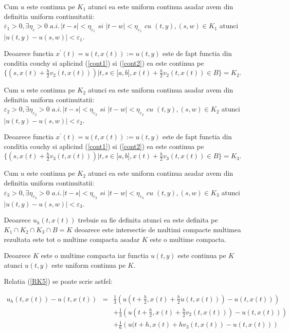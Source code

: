 \documentclass[a4paper,twoside]{book}
\begin{document}
Cum $u$ este continua pe $K_{1}$ atunci ea este uniform continua asadar avem
din definitia uniform continuitatii: \thinspace $\varepsilon _{1}>0,\exists
\eta _{\varepsilon }>0\,\,a.i.\,|t-s|<\eta _{\varepsilon
_{1}}\,\,si\,\,|t-w|<\eta _{\varepsilon _{1}}\,\,cu\,\,(t,y),(s,w)\in K_{1}$
atunci $\left\vert u(t,y)-u(s,w)\right\vert <\varepsilon _{1}$.

Deoarece functia $x^{\prime }(t)=u(t,x(t)):=u(t,y)$ este de fapt functia din
conditia couchy si aplicind (\ref{cont1}) si (\ref{cont2}) ea este continua
pe $\{(s,x(t)+\frac{h}{2}v_{2}(t,x(t)))|t,s\in \lbrack a,b],x(t)+\frac{h}{2}%
v_{2}(t,x(t))\in B\}=K_{2}$.

Cum $u$ este continua pe $K_{2}$ atunci ea este uniform continua asadar avem
din definitia uniform continuitatii: \thinspace $\varepsilon _{2}>0,\exists
\eta _{\varepsilon _{2}}>0\,\,a.i.\,|t-s|<\eta _{\varepsilon
_{2}}\,\,si\,\,|t-w|<\eta _{\varepsilon _{2}}\,\,cu\,\,(t,y),(s,w)\in K_{2}$
atunci $\left\vert u(t,y)-u(s,w)\right\vert <\varepsilon _{2}$.

Deoarece functia $x^{\prime }(t)=u(t,x(t)):=u(t,y)$ este de fapt functia din
conditia couchy si aplicind (\ref{cont1}) si (\ref{cont2}) ea este continua
pe $\{(s,x(t)+\frac{h}{2}v_{3}(t,x(t)))|t,s\in \lbrack a,b],x(t)+\frac{h}{2}%
v_{3}(t,x(t))\in B\}=K_{3}$.

Cum $u$ este continua pe $K_{2}$ atunci ea este uniform continua asadar avem
din definitia uniform continuitatii: \thinspace $\varepsilon _{3}>0,\exists
\eta _{\varepsilon _{3}}>0\,\,a.i.\,|t-s|<\eta _{\varepsilon
_{3}}\,\,si\,\,|t-w|<\eta _{\varepsilon _{3}}\,\,cu\,\,(t,y),(s,w)\in K_{3}$
atunci $\left\vert u(t,y)-u(s,w)\right\vert <\varepsilon _{3}$.

Deoarece $u_{h}(t,x(t))$ trebuie sa fie definita atunci ea este definita pe $%
K_{1}\cap K_{2}\cap K_{3}\cap B=K$ deoarece este intersectie de multimi
compacte multimea rezultata este tot o multime compacta asadar $K$ este o
multime compacta.

Deoarece $K$ este o multime compacta iar functia $u(t,y)$ este continua pe $%
K $ atunci $u(t,y)$ este uniform continua pe $K$.

Relatia (\ref{RK5}) se poate scrie astfel:

\begin{eqnarray*}
u_{h}(t,x(t))-u(t,x(t)) &=&\frac{1}{3}\left( u(t+\frac{h}{2},x(t)+\frac{h}{2}%
u(t,x(t)))-u(t,x(t))\right) \\
&&+\frac{1}{3}\left( u(t+\frac{h}{2},x(t)+\frac{h}{2}%
v_{2}(t,x(t)))-u(t,x(t))\right) \\
&&+\frac{1}{6}\left( u(t+h,x(t)+hv_{3}(t,x(t))-u(t,x(t))\right)
\end{eqnarray*}
\end{document}
